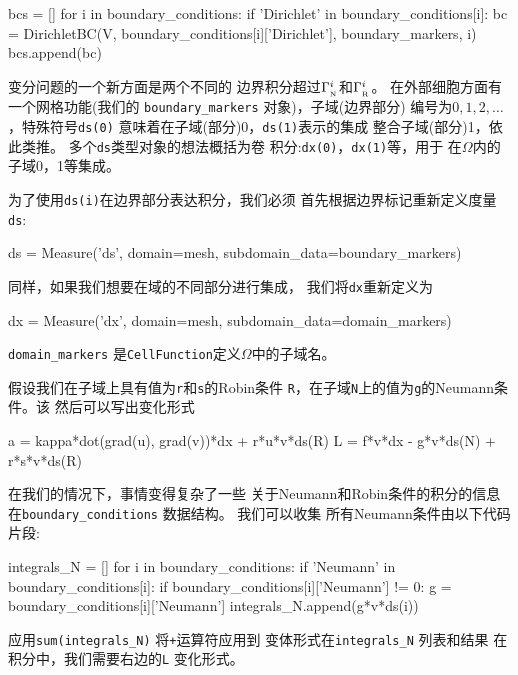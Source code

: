 \begin{python}
bcs = []
for i in boundary_conditions:
    if 'Dirichlet' in boundary_conditions[i]:
        bc = DirichletBC(V, boundary_conditions[i]['Dirichlet'],
                         boundary_markers, i)
        bcs.append(bc)
\end{python}

变分问题的一个新方面是两个不同的
边界积分超过$\GN^i$和$\GR^i$。
在外部细胞方面有一个网格功能(我们的
\verb!boundary_markers! 对象)，子域(边界部分)
编号为$0,1,2,\ldots$，特殊符号\texttt{ds(0)}
意味着在子域(部分)0，\texttt{ds(1)}表示的集成
整合子域(部分)1，依此类推。
多个\texttt{ds}类型对象的想法概括为卷
积分:\texttt{dx(0)}，\texttt{dx(1)}等，用于
在$\Omega$内的子域0，1等集成。

为了使用\texttt{ds(i)}在边界部分表达积分，我们必须
首先根据边界标记重新定义度量\texttt{ds}:

\begin{python}
ds = Measure('ds', domain=mesh, subdomain_data=boundary_markers)
\end{python}
同样，如果我们想要在域的不同部分进行集成，
我们将\texttt{dx}重新定义为

\begin{python}
dx = Measure('dx', domain=mesh, subdomain_data=domain_markers)
\end{python}
\verb!domain_markers! 是\texttt{CellFunction}定义$\Omega$中的子域名。

假设我们在子域上具有值为\texttt{r}和\texttt{s}的Robin条件
\texttt{R}，在子域\texttt{N}上的值为\texttt{g}的Neumann条件。该
然后可以写出变化形式

\begin{python}
a = kappa*dot(grad(u), grad(v))*dx + r*u*v*ds(R)
L = f*v*dx - g*v*ds(N) + r*s*v*ds(R)
\end{python}

在我们的情况下，事情变得复杂了一些
关于Neumann和Robin条件的积分的信息
在\verb!boundary_conditions! 数据结构。 我们可以收集
所有Neumann条件由以下代码片段:

\begin{python}
integrals_N = []
for i in boundary_conditions:
    if 'Neumann' in boundary_conditions[i]:
        if boundary_conditions[i]['Neumann'] != 0:
            g = boundary_conditions[i]['Neumann']
            integrals_N.append(g*v*ds(i))
\end{python}
应用\verb!sum(integrals_N)! 将\texttt{+}运算符应用到
变体形式在\verb!integrals_N! 列表和结果
在积分中，我们需要右边的\texttt{L}
变化形式。

